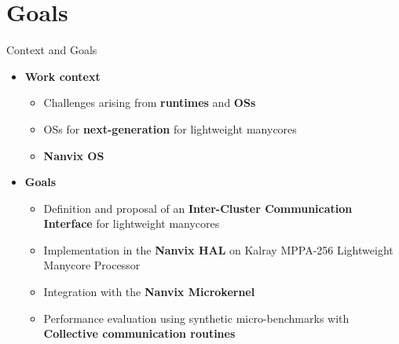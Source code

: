 \section{Goals}

	\begin{frame}[fragile]{Context and Goals}
		\begin{itemize}
			\item \textbf{Work context}
			\begin{itemize}
				\setlength \itemsep{0.3em}

				\item Challenges arising from \textbf{runtimes} and \textbf{OSs}
				\item OSs for \textbf{next-generation} for lightweight manycores
				\item \textbf{Nanvix OS}
			\end{itemize}
		\end{itemize}

		\begin{itemize}
			\item \textbf{Goals}
			\begin{itemize}
				\setlength \itemsep{0.3em}

				\item Definition and proposal of an \textbf{Inter-Cluster Communication Interface} for lightweight manycores
				\item Implementation in the \textbf{Nanvix HAL} on Kalray MPPA-256 Lightweight Manycore Processor
				\item Integration with the \textbf{Nanvix Microkernel}
				\item Performance evaluation using synthetic micro-benchmarks with \textbf{Collective communication routines}
			\end{itemize}
		\end{itemize}

	\end{frame}

		

